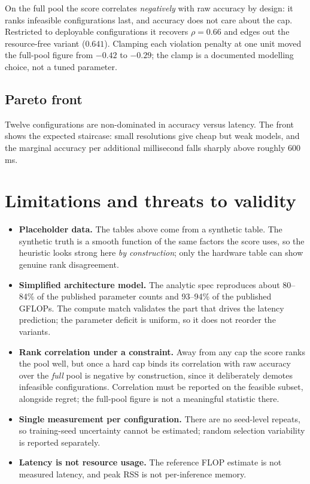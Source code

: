 \documentclass[11pt,a4paper]{article}
\begin{document}
On the full pool the score correlates \emph{negatively} with raw accuracy by
design: it ranks infeasible configurations last, and accuracy does not care about
the cap. Restricted to deployable configurations it recovers $\rho=0.66$ and
edges out the resource-free variant ($0.641$). Clamping each violation penalty at
one unit moved the full-pool figure from $-0.42$ to $-0.29$; the clamp is a
documented modelling choice, not a tuned parameter.

\subsection{Pareto front}

Twelve configurations are non-dominated in accuracy versus latency. The front
shows the expected staircase: small resolutions give cheap but weak models, and
the marginal accuracy per additional millisecond falls sharply above roughly
600\,ms.

\section{Limitations and threats to validity}

\begin{itemize}
  \item \textbf{Placeholder data.} The tables above come from a synthetic table.
        The synthetic truth is a smooth function of the same factors the score
        uses, so the heuristic looks strong here \emph{by construction}; only
        the hardware table can show genuine rank disagreement.
  \item \textbf{Simplified architecture model.} The analytic spec reproduces
        about 80--84\% of the published parameter counts and 93--94\% of the
        published GFLOPs. The compute match validates the part that drives the
        latency prediction; the parameter deficit is uniform, so it does not
        reorder the variants.
  \item \textbf{Rank correlation under a constraint.} Away from any cap the
        score ranks the pool well, but once a hard cap binds its correlation with
        raw accuracy over the \emph{full} pool is negative by construction, since
        it deliberately demotes infeasible configurations. Correlation must be
        reported on the feasible subset, alongside regret; the full-pool figure
        is not a meaningful statistic there.
  \item \textbf{Single measurement per configuration.} There are no seed-level
        repeats, so training-seed uncertainty cannot be estimated; random
        selection variability is reported separately.
  \item \textbf{Latency is not resource usage.} The reference FLOP estimate is
        not measured latency, and peak RSS is not per-inference memory.
\end{itemize}
\end{document}
